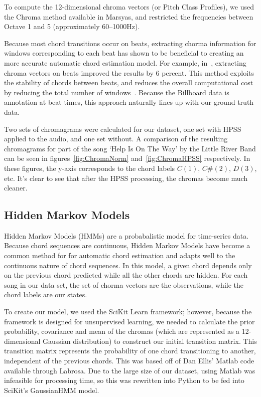 \documentclass{article}
\begin{document}
To compute the 12-dimensional chroma vectors (or Pitch Class Profiles), we used
the Chroma method available in Marsyas, and restricted the frequencies between
Octave 1 and 5 (approximately 60--1000Hz).

Because most chord transitions occur on beats, extracting chorma information for
windows corresponding to each beat has shown to be beneficial to creating an
more accurate automatic chord estimation model. For example, in~\cite{Zenz:20},
extracting chroma vectors on beats improved the results by 6 percent. This method
exploits the stability of chords between beats, and reduces the overall computational
cost by reducing the total number of windows~\cite{McVicor:00}. Because the Billboard
data is annotation at beat times, this approach naturally lines up with our ground truth data.

Two sets of chromagrams were calculated for our dataset, one set with HPSS
applied to the audio, and one set without. A comparison of the resulting
chromagrams for part of the song `Help Is On The Way' by the Little River Band
can be seen in figures~\ref{fig:ChromaNorm} and~\ref{fig:ChromaHPSS}
respectively. In these figures, the y-axis corresponds to the chord labels
$C(1) $, $C\#(2)$, $D(3)$, etc. It's clear to see that after the HPSS processing, the
chromas become much cleaner.

\subsection{Hidden Markov Models}

Hidden Markov Models (HMMs) are a probabalistic model for time-series data. Because chord
sequences are continuous,  Hidden Markov Models have become a common method for
for automatic chord estimation and adapts well to the continuous nature of chord sequences.
In this model, a given chord depends only on the previous chord predicted while all the other chords
are hidden. For each song in our data set, the set of chorma vectors are the observations,
while the chord labels are our states.

To create our model, we used the SciKit Learn framework; however, because the
framework is designed for unsupervised learning, we needed to calculate the
prior probability, covariance and mean of the chromas  (which are represented as
a 12-dimensional Gaussian distribution) to construct our initial transition
matrix.  This transition matrix represents the probability of one chord
transitioning to another, independent of the previous chords.  This was based
off of Dan Ellis' Matlab code available through Labrosa. Due to the large size
of our dataset, using Matlab was infeasible for processing time, so this was
rewritten into Python to be fed into SciKit's GaussianHMM model.
\end{document}
